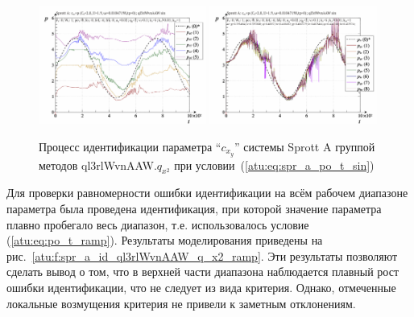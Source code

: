 \begin{figure}[htb!]
  \centerline{
    \includegraphics[width=0.49\textwidth]{p/cha/spr_a/ql3rlWvnAAW_x2/sprott_a_id-p_t_pi_ql3rlWvnAAW_sin.png}
    \hfill
    \includegraphics[width=0.49\textwidth]{p/cha/spr_a/ql3rlWvnAAW_x2/sprott_a_id-p_t_p_ql3rlWvnAAW_sin.png}
  }
  \caption{Процесс идентификации параметра ``$c_{x_y}$'' системы Sprott A группой методов ql3rlWvnAAW.$q_{x^2}$ при условии~(\ref{atu:eq:spr_a_po_t_sin})}
  \label{atu:f:spr_a_id_ql3rlWvnAAW_q_x2_sin}
\end{figure}

Для проверки равномерности ошибки идентификации на всём рабочем диапазоне параметра
была проведена идентификация, при которой значение параметра
плавно пробегало весь диапазон, т.е. использовалось условие (\ref{atu:eq:po_t_ramp}).
Результаты моделирования приведены на рис.~\ref{atu:f:spr_a_id_ql3rlWvnAAW_q_x2_ramp}.
Эти результаты позволяют сделать вывод о том, что в верхней части диапазона
наблюдается плавный рост ошибки идентификации, что не следует из
вида критерия. Однако, отмеченные локальные возмущения критерия
не привели к заметным отклонениям.


